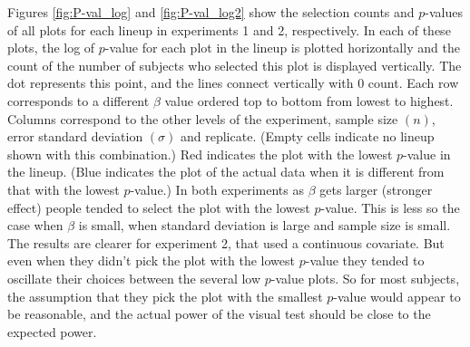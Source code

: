 \documentclass[12pt]{article}
\begin{document}
Figures \ref{fig:P-val_log} and \ref{fig:P-val_log2} show the selection counts and $p$-values of all plots for each lineup in experiments 1 and 2, respectively. In each of these plots, the log of $p$-value for each plot in the lineup is plotted horizontally and the count of the number of subjects who selected this plot is displayed vertically. The dot represents this point, and the lines connect vertically with 0 count. Each row corresponds to a different $\beta$ value ordered top to bottom from lowest to highest. Columns correspond to the other levels of the experiment, sample size $(n)$, error standard deviation $(\sigma)$ and replicate. (Empty cells indicate no lineup shown with this combination.) Red indicates the plot with the lowest $p$-value in the lineup. (Blue indicates the plot of the actual data when it is different from that with the lowest $p$-value.) In both experiments as $\beta$ gets larger (stronger effect) people tended to select the plot with the lowest $p$-value. This is less so the case when $\beta$ is small, when standard deviation is large and sample size is small. The results are clearer for experiment 2, that used a continuous covariate. But even when they didn't pick the plot with the lowest $p$-value they tended to oscillate their choices between the several low $p$-value plots. So for most subjects, the assumption that they pick the plot with the smallest $p$-value would appear to be reasonable, and the actual power of the visual test should be close to the expected power.
\end{document}
